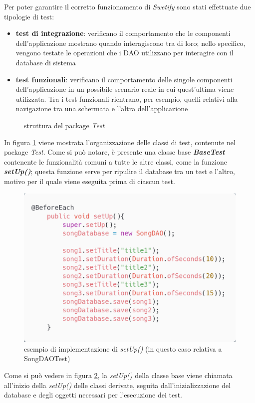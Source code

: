 \documentclass{article}
\begin{document}
  Per poter garantire il corretto funzionamento di \textit{Swetify} sono stati effettuate due tipologie di test:
  \begin{itemize}
    \item \textbf{test di integrazione}: verificano il comportamento che le componenti dell'applicazione mostrano quando interagiscono tra di loro; nello specifico, vengono testate le operazioni che i DAO utilizzano per interagire con il database di sistema
    \item \textbf{test funzionali}: verificano il comportamento delle singole componenti dell'applicazione in un possibile scenario reale in cui quest'ultima viene utilizzata. Tra i test funzionali rientrano, per esempio, quelli relativi alla navigazione tra una schermata e l'altra dell'applicazione
  \end{itemize}

  \begin{figure}[H]
    
    \caption{struttura del package \textit{Test}}
    \label{fig:testsUML}
  \end{figure}

  In figura \ref{fig:testsUML} viene mostrata l'organizzazione delle classi di test, contenute nel package \textit{Test}. Come si può notare, è presente una classe base \textbf{\textit{BaseTest}} contenente le funzionalità comuni a tutte le altre classi, come la funzione \textbf{\textit{setUp()}}; questa funzione serve per ripulire il database tra un test e l'altro, motivo per il quale viene eseguita prima di ciascun test.

  \begin{figure}[H]
    \centering
    \includegraphics[width=0.5\linewidth]{setUp.png}
    \caption{esempio di implementazione di \textit{setUp()} (in questo caso relativa a SongDAOTest)}
    \label{fig:setUp}
  \end{figure}


  Come si può vedere in figura \ref{fig:setUp}, la \textit{setUp()} della classe base viene chiamata all'inizio della \textit{setUp()} delle classi
  derivate, seguita dall'inizializzazione del database e degli oggetti necessari per l'esecuzione dei test.
\end{document}
